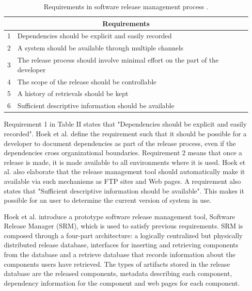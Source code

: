 \documentclass[conference]{IEEEtran}
\begin{document}
\begin{center}
\begin{table}[h]
\caption{Requirements in software release management process \cite{van1997software}.}
    \begin{tabular}{ | p{0.5cm} | p{7cm} |}
    \hline
    \multicolumn{2}{|c|}{Requirements} \\
    \hline
    1 & Dependencies should be explicit and easily recorded \\ \hline
    2 & A system should be available through multiple channels \\ \hline
    3 & The release process should involve minimal effort on the part of the developer \\ \hline
    4 & The scope of the release should be controllable \\ \hline
    5 & A history of retrievals should be kept \\ \hline
    6 & Sufficient descriptive information should be available \\ \hline
    \end{tabular}
    \end{table}
\end{center}

Requirement 1 in Table II states that "Dependencies should be explicit and easily recorded". Hoek et al. define the requirement such that it should be possible for a developer to document dependencies as part of the release process, even if the dependencies cross organizational boundaries. Requirement 2 means that once a release is made, it is made available to all environments where it is used. Hoek et al. also elaborate that the release management tool should automatically make it available via such mechanisms as FTP sites and Web pages. A requirement also states that "Sufficient descriptive information should be available". This makes it possible for an user to determine the current version of system in use.

Hoek et al. introduce a prototype software release management tool, Software Release Manager (SRM), which is used to satisfy previous requirements. SRM is composed through a four-part architecture: a logically centralized but physically distributed release database, interfaces for inserting and retrieving components from the database and a retrieve database that records information about the components users have retrieved. The types of artifacts stored in the release database are the released components, metadata describing each component, dependency information for the component and web pages for each component. 
\end{document}
